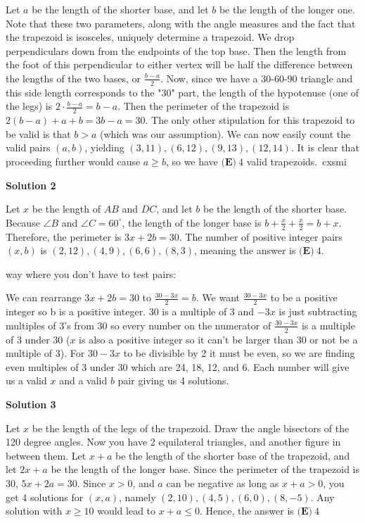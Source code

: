 \begin{enumerate}
Let $a$ be the length of the shorter base, and let $b$ be the length of the longer one. Note that these two parameters, along with the angle measures and the fact that the trapezoid is isosceles, uniquely determine a trapezoid. We drop perpendiculars down from the endpoints of the top base. Then the length from the foot of this perpendicular to either vertex will be half the difference between the lengths of the two bases, or $\frac{b-a}{2}$. Now, since we have a 30-60-90 triangle and this side length corresponds to the "30" part, the length of the hypotenuse (one of the legs) is $2 \cdot \frac{b-a}{2} = b-a$. Then the perimeter of the trapezoid is $2(b-a)+a+b=3b-a=30$. The only other stipulation for this trapezoid to be valid is that $b>a$ (which was our assumption). We can now easily count the valid pairs $(a,b)$, yielding $(3,11),(6,12),(9,13),(12,14)$. It is clear that proceeding further would cause $a \geq b$, so we have $\boxed{\textbf{(E)}~4}$ valid trapezoids.~cxsmi

 



\textbf{Solution 2}

Let $x$ be the length of $AB$ and $DC$, and let $b$ be the length of the shorter base. Because $\angle B$ and $\angle C = 60^{\circ}$, the length of the longer base is $b + \frac{x}{2} + \frac{x}{2} = b + x$. Therefore, the perimeter is $3x + 2b = 30$. The number of positive integer pairs $(x, b)$ is $(2,12), (4,9), (6,6), (8,3)$, meaning the answer is $\boxed{\textbf{(E)}~4}$.

 way where you don't have to test pairs:

 We can rearrange $3x + 2b = 30$ to $\frac{30-3x}{2} = b$. We want $\frac{30-3x}{2}$ to be a positive integer so b is a positive integer. 30 is a multiple of 3 and $-3x$ is just subtracting multiples of 3's from 30 so every number on the numerator of $\frac{30-3x}{2}$ is a multiple of 3 under 30 ($x$ is also a positive integer so it can't be larger than 30 or not be a multiple of 3). For $30-3x$ to be divisible by 2 it must be even, so we are finding even multiples of 3 under 30 which are 24, 18, 12, and 6. Each number will give us a valid $x$ and a valid $b$ pair giving us 4 solutions.

 



\textbf{Solution 3}

Let $x$ be the length of the legs of the trapezoid. Draw the angle bisectors of the 120 degree angles. Now you have 2 equilateral triangles, and another figure in between them. Let $x+a$ be the length of the shorter base of the trapezoid, and let $2x+a$ be the length of the longer base. Since the perimeter of the trapezoid is 30, $5x+2a = 30$. Since $x>$0, and $a$ can be negative as long as $x+a>0$, you get 4 solutions for $(x,a)$, namely $(2,10), (4,5), (6,0), (8,-5)$. Any solution with $x\ge10$ would lead to $x+a\le0$. Hence, the answer is $\boxed{\textbf{(E)}~4}$





\end{enumerate}
